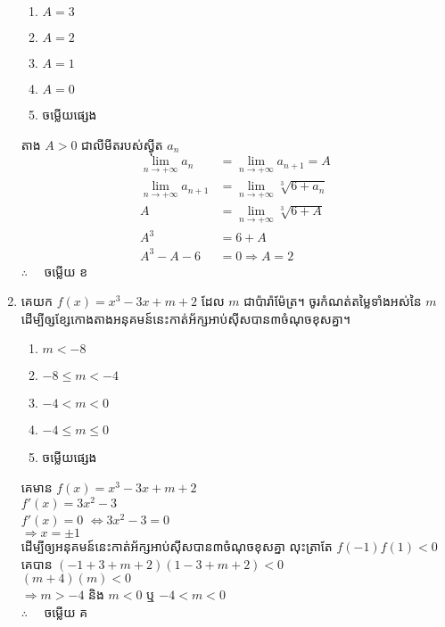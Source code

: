 \documentclass[a4paper,12pt]{article}
\begin{document}
\begin{enumerate}[m]
	\begin{enumerate}[k,5]
		\item $A=3$
		\item $A=2$
		\item $A=1$
		\item $A=0$
		\item ចម្លើយផ្សេង
	\end{enumerate}
	\answer
	\begin{center}
		តាង $A>0$ ជាលីមីតរបស់ស៊្វីត $a_n$\\
		\begin{align*}
			\lim\limits_{n\to +\infty}a_n&=\lim\limits_{n\to +\infty}a_{n+1}=A\\
			\lim\limits_{n\to +\infty}a_{n+1}&=\lim\limits_{n\to +\infty}\sqrt[3]{6+a_n}\\
			A&=\lim\limits_{n\to +\infty}\sqrt[3]{6+A}\\
			A^3&=6+A\\
			A^3-A-6&=0 \Rightarrow A=2
		\end{align*}
		$\therefore \quad$ \kml ចម្លើយ \kbk ខ
	\end{center}
	{\color{blue}\hrulefill}
	\item គេយក $f(x)=x^3-3x+m+2$ ដែល $m$ ជាប៉ារ៉ាម៉ែត្រ។ ចូរកំណត់តម្លៃទាំងអស់នៃ $m$ ដើម្បីឲ្សខ្សែកោងតាងអនុគមន៍នេះកាត់អ័ក្សអាប់ស៊ីសបាន៣ចំណុចខុសគ្នា។
	\begin{enumerate}[k,5]
		\item $m<-8$
		\item $-8\le m<-4$
		\item $-4<m<0$
		\item $-4\le m \le0$
		\item ចម្លើយផ្សេង
	\end{enumerate}
	\answer
	\begin{center}
		គេមាន $f(x)=x^3-3x+m+2$\\
			$f'(x)=3x^2-3$\\
			$f'(x)=0$
			$\Leftrightarrow 3x^2-3=0$\\
			$\Rightarrow x=\pm 1$\\
			ដើម្បីឲ្យអនុគមន៍នេះកាត់អ័ក្សអាប់ស៊ីសបាន៣ចំណុចខុសគ្នា លុះត្រាតែ $f(-1)f(1)<0$\\
			គេបាន $\left(-1+3+m+2\right)\left(1-3+m+2\right)<0$\\
			$\left(m+4\right)\left(m\right)<0$\\
			$\Rightarrow m>-4$ និង $m<0$ ឬ $-4<m<0$\\
			$\therefore \quad$ \kml ចម្លើយ \kbk គ
	\end{center}

\end{enumerate}
\end{document}
